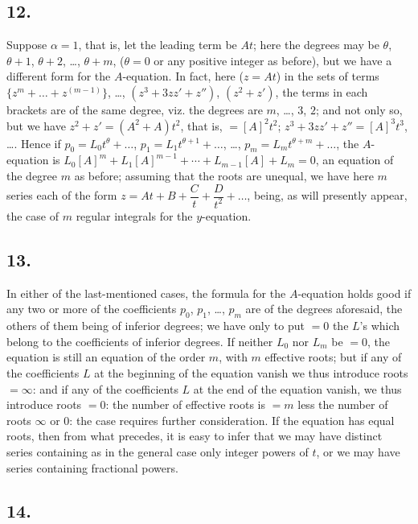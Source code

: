 \documentclass[11pt,a4paper]{article}
\theoremstyle{definition}
\begin{document}
\subsection*{12.}

Suppose $\alpha = 1$, that is, let the leading term be $At$; here the degrees may be $\theta$, $\theta + 1$, $\theta + 2$, \ldots, $\theta + m$, ($\theta = 0$ or any positive integer as before), but we have a different form for the $A$-equation. In fact, here ($z = At$) in the sets of terms $\{z^m + \ldots + z^{(m-1)}\}$, \ldots, $(z^3 + 3zz' + z'')$, $(z^2 + z')$, the terms in each brackets are of the same degree, viz. the degrees are $m$, \ldots, $3$, $2$; and not only so, but we have $z^2 + z' = (A^2 + A)t^2$, that is, $= [A]^2 t^2$; $z^3 + 3zz' + z'' = [A]^3 t^3$, \ldots. Hence if $p_0 = L_0 t^\theta + \ldots$, $p_1 = L_1 t^{\theta + 1} + \ldots$, \ldots, $p_m = L_m t^{\theta + m} + \ldots$, the $A$-equation is $L_0 [A]^m + L_1 [A]^{m-1} + \cdots + L_{m-1}[A] + L_m = 0$, an equation of the degree $m$ as before; assuming that the roots are unequal, we have here $m$ series each of the form $z = At + B + \dfrac{C}{t} + \dfrac{D}{t^2} + \ldots$, being, as will presently appear, the case of $m$ regular integrals for the $y$-equation.

\subsection*{13.}

In either of the last-mentioned cases, the formula for the $A$-equation holds good if any two or more of the coefficients $p_0$, $p_1$, \ldots, $p_m$ are of the degrees aforesaid, the others of them being of inferior degrees; we have only to put $= 0$ the $L$'s which belong to the coefficients of inferior degrees. If neither $L_0$ nor $L_m$ be $= 0$, the equation is still an equation of the order $m$, with $m$ effective roots; but if any of the coefficients $L$ at the beginning of the equation vanish we thus introduce roots $= \infty$: and if any of the coefficients $L$ at the end of the equation vanish, we thus introduce roots $= 0$: the number of effective roots is $= m$ less the number of roots $\infty$ or $0$: the case requires further consideration. If the equation has equal roots, then from what precedes, it is easy to infer that we may have distinct series containing as in the general case only integer powers of $t$, or we may have series containing fractional powers.

\subsection*{14.}
\end{document}

